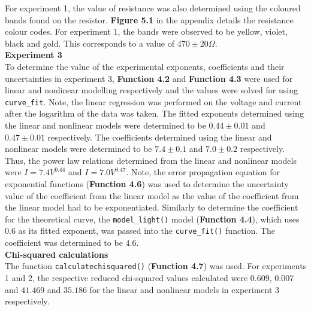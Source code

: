 \documentclass[
	letterpaper, %
	10pt, %
]{CSUniSchoolLabReport}
\begin{document}
For experiment 1, the value of resistance was also determined using the coloured bands found on the resistor. \textbf{Figure 5.1} in the
	appendix details the resistance colour codes. For experiment 1, the bands were observed to be yellow, violet, black and gold.
	This corresponds to a value of $470 \pm 20 \Omega$.
\vspace{5pt}\\
\textbf{Experiment 3}\\
To determine the value of the experimental exponents, coefficients and their uncertainties in experiment 3, \textbf{Function 4.2} and \textbf{Function 4.3}
	were used for linear and nonlinear modelling respectively and the values were solved for using \lstinline{curve_fit}.
	Note, the linear regression was performed on the voltage and current after the logarithm of the data was taken. The fitted exponents determined using
	the linear and nonlinear models were determined to be $0.44 \pm 0.01$
	and $0.47 \pm 0.01$ respectively. The coefficients determined using the linear and nonlinear models were determined to be $7.4 \pm 0.1$ and
	$7.0 \pm 0.2$ respectively. Thus, the power law relations determined from the linear and nonlinear models were $ I = 7.4 V ^ {0.44}$ and
	$I = 7.0 V ^{0.47}$. Note, the error propagation equation for exponential functions (\textbf{Function 4.6}) was used to determine the uncertainty value of the coefficient
	from the linear model as the value of the coefficient from the linear model had to be exponentiated. Similarly to determine the coefficient for the
	theoretical curve, the \lstinline{model_light()} model (\textbf{Function 4.4}), which uses $0.6$ as its fitted exponent, was passed into the \lstinline{curve_fit()} function.
	The coefficient was determined to be $4.6$.
{\vspace{10pt}}\\
{\large\textbf{Chi-squared calculations}}
{\vspace{5pt}}\\
The function \lstinline{calculatechisquared()} (\textbf{Function 4.7}) was used. For experiments 1 and 2, the respective reduced chi-squared values calculated were
	$0.609$, $0.007$ and $41.469$ and $35.186$ for the linear and nonlinear models in experiment 3 respectively.\\
\end{document}
